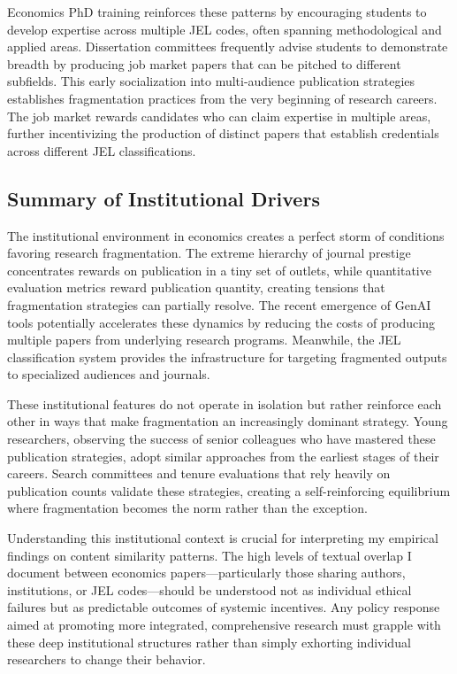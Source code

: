 \documentclass[12pt]{article}
\begin{document}
Economics PhD training reinforces these patterns by encouraging students to develop expertise across multiple JEL codes, often spanning methodological and applied areas. Dissertation committees frequently advise students to demonstrate breadth by producing job market papers that can be pitched to different subfields. This early socialization into multi-audience publication strategies establishes fragmentation practices from the very beginning of research careers. The job market rewards candidates who can claim expertise in multiple areas, further incentivizing the production of distinct papers that establish credentials across different JEL classifications.

\subsection{Summary of Institutional Drivers}

The institutional environment in economics creates a perfect storm of conditions favoring research fragmentation. The extreme hierarchy of journal prestige concentrates rewards on publication in a tiny set of outlets, while quantitative evaluation metrics reward publication quantity, creating tensions that fragmentation strategies can partially resolve. The recent emergence of GenAI tools potentially accelerates these dynamics by reducing the costs of producing multiple papers from underlying research programs. Meanwhile, the JEL classification system provides the infrastructure for targeting fragmented outputs to specialized audiences and journals.

These institutional features do not operate in isolation but rather reinforce each other in ways that make fragmentation an increasingly dominant strategy. Young researchers, observing the success of senior colleagues who have mastered these publication strategies, adopt similar approaches from the earliest stages of their careers. Search committees and tenure evaluations that rely heavily on publication counts validate these strategies, creating a self-reinforcing equilibrium where fragmentation becomes the norm rather than the exception.

Understanding this institutional context is crucial for interpreting my empirical findings on content similarity patterns. The high levels of textual overlap I document between economics papers—particularly those sharing authors, institutions, or JEL codes—should be understood not as individual ethical failures but as predictable outcomes of systemic incentives. Any policy response aimed at promoting more integrated, comprehensive research must grapple with these deep institutional structures rather than simply exhorting individual researchers to change their behavior.
\end{document}
